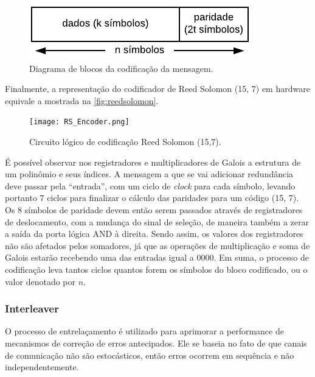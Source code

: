 	\begin{figure}[!htb]
		\caption{\label{fig_reed_solomon_message}Diagrama de blocos da codificação da mensagem.}
		\centering
		\includegraphics[width=0.4\textheight]{frame/rs-codeword.pdf}
	\end{figure}

	Finalmente, a representação do codificador de Reed Solomon (15, 7) em hardware equivale a mostrada na \autoref{fig:reedsolomon}.

	\begin{figure}[!htb]
		\caption{\label{RS_encoder_logic}Circuito lógico de codificação Reed Solomon (15,7).}
		\centering
		\texttt{[image: RS\_Encoder.png]}
		\label{fig:reedsolomon}
	\end{figure}

	É possível observar nos registradores e multiplicadores de Galois a estrutura de um polinômio e seus índices. A mensagem a que se vai adicionar redundância deve passar pela ``entrada'', com um ciclo de \textit{clock} para cada símbolo, levando portanto 7 ciclos para finalizar o cálculo das paridades para um código (15, 7). Os 8 símbolos de paridade devem então serem passados através de registradores de deslocamento, com a mudança do sinal de seleção, de maneira também a zerar a saída da porta lógica AND à direita. Sendo assim, os valores dos registradores não são afetados pelos somadores, já que as operações de multiplicação e soma de Galois estarão recebendo uma das entradas igual a 0000. Em suma, o processo de codificação leva tantos ciclos quantos forem os símbolos do bloco codificado, ou o valor denotado por $n$.


	\subsubsection{Interleaver}

	O processo de entrelaçamento é utilizado para aprimorar a performance de mecanismos de correção de erros antecipados. Ele se baseia no fato de que canais de comunicação não são estocásticos, então erros ocorrem em sequência e não independentemente.

